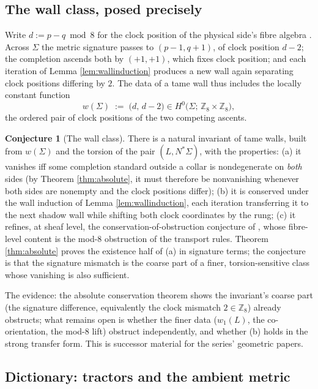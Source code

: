 \documentclass[11pt]{article}
\theoremstyle{definition}
\newtheorem{conjecture}[theorem]{Conjecture}
\newcommand{\shL}{L}
\newcommand{\Sig}{\Sigma}
\begin{document}
\subsection{The wall class, posed precisely}\label{subsec:wallclass}

Write $d := p - q \bmod 8$ for the clock position of the physical side's fibre algebra \cite[\S7]{ButlerT1}. Across $\Sig$ the metric signature passes to $(p{-}1, q{+}1)$, of clock position $d - 2$; the completion ascends both by $(+1,+1)$, which fixes clock position; and each iteration of Lemma \ref{lem:wallinduction} produces a new wall again separating clock positions differing by $2$. The data of a tame wall thus includes the locally constant function
\[
w(\Sig) \;:=\; \bigl(d,\, d-2\bigr) \in H^0\bigl(\Sig;\, \mathbb{Z}_8 \times \mathbb{Z}_8\bigr),
\]
the ordered pair of clock positions of the two competing ascents.

\begin{conjecture}[The wall class]\label{conj:wallclass}
There is a natural invariant of tame walls, built from $w(\Sig)$ and the torsion of the pair $(\shL, N^*\Sig)$, with the properties: (a) it vanishes iff some completion standard outside a collar is nondegenerate on \emph{both} sides (by Theorem \ref{thm:absolute}, it must therefore be nonvanishing whenever both sides are nonempty and the clock positions differ); (b) it is conserved under the wall induction of Lemma \ref{lem:wallinduction}, each iteration transferring it to the next shadow wall while shifting both clock coordinates by the rung; (c) it refines, at sheaf level, the conservation-of-obstruction conjecture of \cite[Conj.~7.9]{ButlerT1}, whose fibre-level content is the mod-8 obstruction of the transport rules. Theorem \ref{thm:absolute} proves the existence half of (a) in signature terms; the conjecture is that the signature mismatch is the coarse part of a finer, torsion-sensitive class whose vanishing is also sufficient.
\end{conjecture}

The evidence: the absolute conservation theorem shows the invariant's coarse part (the signature difference, equivalently the clock mismatch $2 \in \mathbb{Z}_8$) already obstructs; what remains open is whether the finer data ($w_1(\shL)$, the co-orientation, the mod-8 lift) obstruct independently, and whether (b) holds in the strong transfer form. This is successor material for the series' geometric papers.

\subsection{Dictionary: tractors and the ambient metric}\label{subsec:tractordict}
\end{document}
